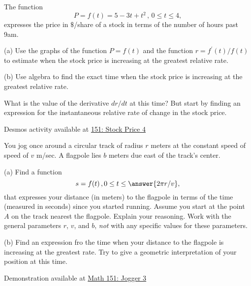 \documentclass{ximera}
\begin{document}
\begin{question}  \label{Q:dfgt4tnhy}
The function 
\[
      P = f(t) = 5 -3t + t^2 \, , \, 0\leq t \leq 4 , 
\]
expresses the price in $\$$/share of a stock in terms of the number of hours past 9am.

(a) Use the graphs of the function $P=f(t)$ and the function $r=f^\prime(t)/f(t)$  to estimate when the stock price is increasing at the greatest relative rate.

(b) Use algebra to find the exact time when the stock price is increasing at the greatest relative rate.
\begin{hint}
What is the value of the derivative $dr/dt$ at this time? But start by finding an expression for the instantaneous relative rate of change in the stock price.
\end{hint}


\begin{onlineOnly}
    \begin{center}
\end{center}
\end{onlineOnly}

Desmos activity available at \href{https://www.desmos.com/calculator/y78fnyy7s3}{151: Stock Price 4}

\end{question}


\begin{question}  \label{Qdgvbjuhjyhu}
You jog once around a circular track of radius $r$ meters at the constant speed of speed of $v$ m/sec. A flagpole lies $b$ meters due east of the track's center.

(a) Find a function 
\[
   s = f(t) \, , 0\leq t \leq  \answer{2\pi r/v},
\]
that expresses your distance (in meters) to the flagpole in terms of the time (measured in seconds) since you started running. Assume you start at the point $A$ on the track nearest the flagpole. Explain your reasoning. Work with the general parameters $r$, $v$, and $b$, \emph{not} with any specific values for these parameters.


(b) Find an expression fro the time when your distance to the flagpole is increasing at the greatest rate. Try to give a geometric interpretation of your position at this time.

\begin{onlineOnly}
    \begin{center}
\end{center}
\end{onlineOnly}

Demonstration available at \href{https://www.desmos.com/calculator/bxofhvfbfs}{Math 151: Jogger 3}


\end{question}
\end{document}
